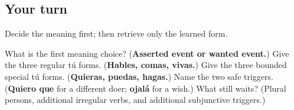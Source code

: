 \subsection*{Your turn}
Decide the meaning first; then retrieve only the learned form.

\begin{tcolorbox}[breakable,colback=teal!4,colframe=teal!35!black,title={Before you move on}]
What is the first meaning choice? (\textbf{Asserted event or wanted event.}) Give the three regular tú forms. (\textbf{Hables, comas, vivas.}) Give the three bounded special tú forms. (\textbf{Quieras, puedas, hagas.}) Name the two safe triggers. (\textbf{Quiero que} for a different doer; \textbf{ojalá} for a wish.) What still waits? (Plural persons, additional irregular verbs, and additional subjunctive triggers.)
\end{tcolorbox}
